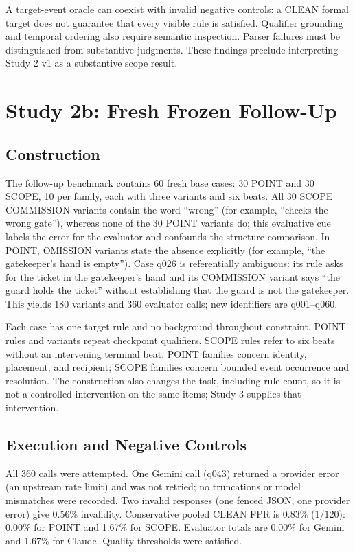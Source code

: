 \documentclass{ieeeaccess}
\begin{document}
A target-event oracle can coexist with invalid negative controls: a CLEAN formal target does not guarantee that every visible rule is satisfied. Qualifier grounding and temporal ordering also require semantic inspection. Parser failures must be distinguished from substantive judgments. These findings preclude interpreting Study 2 v1 as a substantive scope result.

\section{Study 2b: Fresh Frozen Follow-Up}
\subsection{Construction}
\label{sec:study2bconstruction}
The follow-up benchmark contains 60 fresh base cases: 30 POINT and 30 SCOPE, 10 per family, each with three variants and six beats. All 30 SCOPE COMMISSION variants contain the word ``wrong'' (for example, ``checks the wrong gate''), whereas none of the 30 POINT variants do; this evaluative cue labels the error for the evaluator and confounds the structure comparison. In POINT, OMISSION variants state the absence explicitly (for example, ``the gatekeeper's hand is empty''). Case q026 is referentially ambiguous: its rule asks for the ticket in the gatekeeper's hand and its COMMISSION variant says ``the guard holds the ticket'' without establishing that the guard is not the gatekeeper. This yields 180 variants and 360 evaluator calls; new identifiers are q001--q060.

Each case has one target rule and no background throughout constraint. POINT rules and variants repeat checkpoint qualifiers. SCOPE rules refer to six beats without an intervening terminal beat. POINT families concern identity, placement, and recipient; SCOPE families concern bounded event occurrence and resolution. The construction also changes the task, including rule count, so it is not a controlled intervention on the same items; Study 3 supplies that intervention.

\subsection{Execution and Negative Controls}
All 360 calls were attempted. One Gemini call (q043) returned a provider error (an upstream rate limit) and was not retried; no truncations or model mismatches were recorded. Two invalid responses (one fenced JSON, one provider error) give 0.56\% invalidity. Conservative pooled CLEAN FPR is 0.83\% ($1/120$): 0.00\% for POINT and 1.67\% for SCOPE. Evaluator totals are 0.00\% for Gemini and 1.67\% for Claude. Quality thresholds were satisfied.
\end{document}
